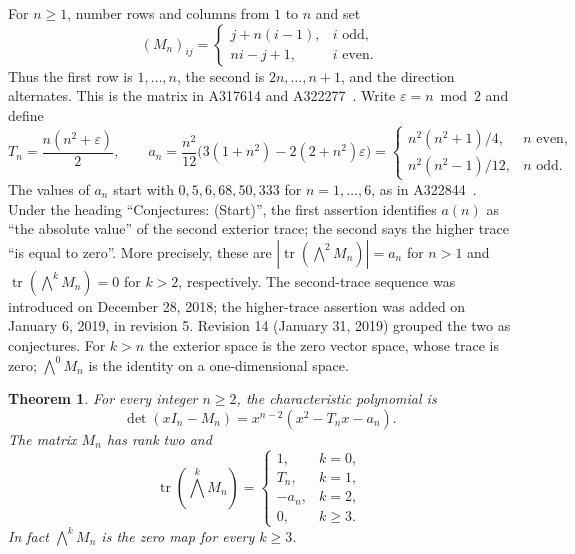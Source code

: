 \documentclass[11pt]{article}
\newtheorem{theorem}{Theorem}
\DeclareMathOperator{\tr}{tr}
\newcommand{\eps}{\varepsilon}
\begin{document}
For $n\geq1$, number rows and columns from $1$ to $n$ and set
\begin{equation}\label{eq:matrix}
(M_n)_{ij}=\begin{cases}
j+n(i-1),&i\text{ odd},\\
ni-j+1,&i\text{ even}.
\end{cases}
\end{equation}
Thus the first row is $1,\ldots,n$, the second is $2n,\ldots,n+1$,
and the direction alternates. This is the matrix in A317614 and
A322277~\cite{s317614,s322277}.
Write $\eps=n\bmod2$ and define
\begin{equation}\label{eq:quantities}
T_n=\frac{n(n^2+\eps)}2,\qquad
a_n=\frac{n^2}{12}\bigl(3(1+n^2)-2(2+n^2)\eps\bigr)
=\begin{cases}
n^2(n^2+1)/4,&n\text{ even},\\
n^2(n^2-1)/12,&n\text{ odd}.
\end{cases}
\end{equation}
The values of $a_n$ start with $0,5,6,68,50,333$ for $n=1,\ldots,6$,
as in A322844~\cite{s322844}. Under the heading ``Conjectures: (Start)'',
the first assertion identifies $a(n)$ as ``the absolute value'' of the
second exterior trace; the second says the higher trace ``is equal to zero''.
More precisely, these are
$|\tr(\bigwedge^2 M_n)|=a_n$ for $n>1$ and
$\tr(\bigwedge^k M_n)=0$ for $k>2$, respectively.
The second-trace sequence was introduced on December 28, 2018;
the higher-trace assertion was added on January 6, 2019, in revision 5.
Revision 14 (January 31, 2019) grouped the two as conjectures.
For $k>n$ the exterior space is the zero vector space, whose trace is zero;
$\bigwedge^0 M_n$ is the identity on a one-dimensional space.

\begin{theorem}\label{thm:main}
For every integer $n\geq2$, the characteristic polynomial is
\begin{equation}\label{eq:charpoly}
\det(xI_n-M_n)=x^{n-2}(x^2-T_nx-a_n).
\end{equation}
The matrix $M_n$ has rank two and
\begin{equation}\label{eq:ext}
\tr(\textstyle\bigwedge^k M_n)=
\begin{cases}
1,&k=0,\\ T_n,&k=1,\\ -a_n,&k=2,\\ 0,&k\geq3.
\end{cases}
\end{equation}
In fact $\bigwedge^k M_n$ is the zero map for every $k\geq3$.
\end{theorem}
\end{document}
